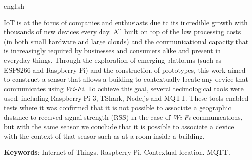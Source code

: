 \begin{resumo}[Abstract]
\begin{otherlanguage*}{english}

	IoT is at the focus of companies and enthusiasts due to its incredible
	growth with thousands of new devices every day. All built on top of the low
	processing costs (in both small hardware and large clouds) and the
	communicational capacity that is increasingly required by businesses and
	consumers alike and present in everyday things.
	Through the exploration of emerging platforms (such as ESP8266 and Raspberry
	Pi) and the construction of prototypes, this work aimed to construct a
	sensor that allows a building to contextually locate any device that
	communicates using \emph{Wi-Fi}.
	To achieve this goal, several technological tools were used, including
	Raspberry Pi 3, TShark, Node.js and MQTT. These tools enabled tests where it
	was confirmed that it is not possible to associate a geographic distance to
	received signal strength (RSS) in the case of \emph{Wi-Fi} communications, but
	with the same sensor we conclude that it is possible to associate a device
	with the context of that sensor such as at a room inside a building.

	\textbf{Keywords}: Internet of Things. Raspberry Pi. Contextual location. MQTT.
\end{otherlanguage*}
\end{resumo}
